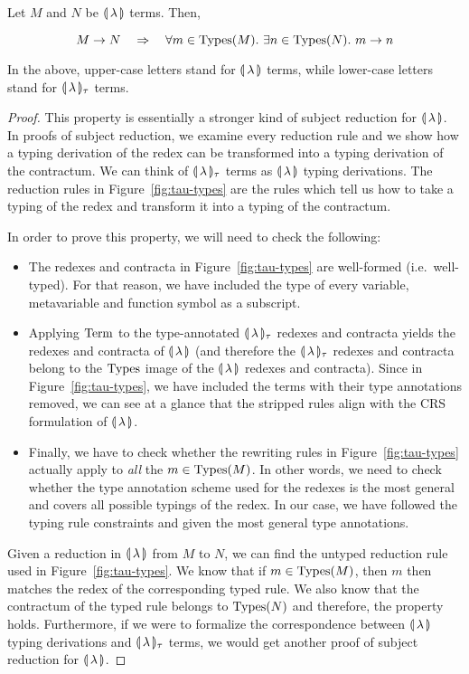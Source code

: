 \begin{lemma}
  \label{lem:infinite-chains}
  Let $M$ and $N$ be $\llparenthesis \, \lambda \, \rrparenthesis$ terms. Then,

  $$
  M \to N \quad \Rightarrow \quad
  \forall m \in \operatorname{Types}(M).\ \exists n \in \operatorname{Types}(N).\ m \to n
  $$
  
  In the above, upper-case letters stand for $\llparenthesis \, \lambda \, \rrparenthesis$ terms,
  while lower-case letters stand for $\llparenthesis \, \lambda \, \rrparenthesis_\tau$ terms.
\end{lemma}

\begin{proof}
  This property is essentially a stronger kind of subject reduction for
  $\llparenthesis \, \lambda \, \rrparenthesis$. In proofs of subject reduction, we examine every
  reduction rule and we show how a typing derivation of the redex can be
  transformed into a typing derivation of the contractum. We can think of
  $\llparenthesis \, \lambda \, \rrparenthesis_\tau$ terms as $\llparenthesis \, \lambda \, \rrparenthesis$ typing
  derivations. The reduction rules in Figure~\ref{fig:tau-types} are the
  rules which tell us how to take a typing of the redex and transform it
  into a typing of the contractum.
  
  In order to prove this property, we will need to check the following:
  \begin{itemize}
  \item The redexes and contracta in Figure~\ref{fig:tau-types} are
    well-formed (i.e.\ well-typed). For that reason, we have included the
    type of every variable, metavariable and function symbol as a
    subscript.
  \item Applying $\operatorname{Term}$ to the type-annotated $\llparenthesis \, \lambda \, \rrparenthesis_\tau$
    redexes and contracta yields the redexes and contracta of
    $\llparenthesis \, \lambda \, \rrparenthesis$ (and therefore the $\llparenthesis \, \lambda \, \rrparenthesis_\tau$ redexes
    and contracta belong to the $\operatorname{Types}$ image of the $\llparenthesis \, \lambda \, \rrparenthesis$
    redexes and contracta). Since in Figure~\ref{fig:tau-types}, we have
    included the terms with their type annotations removed, we can see at a
    glance that the stripped rules align with the CRS formulation of
    $\llparenthesis \, \lambda \, \rrparenthesis$.
  \item Finally, we have to check whether the rewriting rules in
    Figure~\ref{fig:tau-types} actually apply to \emph{all} the
    $m \in \operatorname{Types}(M)$. In other words, we need to check whether the type
    annotation scheme used for the redexes is the most general and covers
    all possible typings of the redex. In our case, we have followed the
    typing rule constraints and given the most general type annotations.
  \end{itemize}
  
  Given a reduction in $\llparenthesis \, \lambda \, \rrparenthesis$ from $M$ to $N$, we can find the
  untyped reduction rule used in Figure~\ref{fig:tau-types}. We know that
  if $m \in \operatorname{Types}(M)$, then $m$ then matches the redex of the
  corresponding typed rule. We also know that the contractum of the typed
  rule belongs to $\operatorname{Types}(N)$ and therefore, the property
  holds. Furthermore, if we were to formalize the correspondence between
  $\llparenthesis \, \lambda \, \rrparenthesis$ typing derivations and $\llparenthesis \, \lambda \, \rrparenthesis_\tau$ terms,
  we would get another proof of subject reduction for $\llparenthesis \, \lambda \, \rrparenthesis$.
\end{proof}


